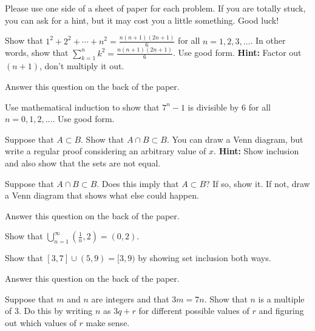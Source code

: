 \yourname


\noindent
Please use one side of a sheet of paper for each problem.
If you are totally stuck, you can ask for a hint, but it may cost you a little something.
Good luck!

\vspace{0.2in}

\blist{0.0in}
\item Show that $1^2 + 2^2 + \cdots + n^2 = \frac{n(n+1)(2n+1)}{6}$ for all $n = 1, 2, 3, \ldots$.
In other words, show that $\sum_{k=1}^{n} k^2 = \frac{n(n+1)(2n+1)}{6}$.
Use good form.
{\bf Hint:} Factor out $(n+1)$, don't multiply it out.
\vfill


\item Answer this question on the back of the paper.

Use mathematical induction to show that $7^n - 1$ is divisible by 6 for all $n = 0, 1, 2, \ldots$.
Use good form.

\pagebreak

\item Suppose that $A \subset B$.  Show that $A \cap B \subset B$.
You can draw a Venn diagram, but write a regular proof considering an arbitrary value of $x$.
{\bf Hint:} Show inclusion and also show that the sets are not equal.
\vspace{3in}

Suppose that $A \cap B \subset B$.  Does this imply that $A \subset B$?  If so, show it.  If not, draw a Venn diagram that shows what else could happen.


\vfill

\item Answer this question on the back of the paper.

Show that $\bigcup_{n=1}^{\infty} (\frac{1}{n},2) = (0,2)$.

\pagebreak

\item Show that $[3,7] \cup (5,9) = [3,9)$ by showing set inclusion both ways.
\vfill


\item Answer this question on the back of the paper.

Suppose that $m$ and $n$ are integers and that $3m = 7n$.
Show that $n$ is a multiple of 3.
Do this by writing $n$ as $3q+r$ for different possible values of $r$ and figuring out which values of $r$ make sense.

\elist
